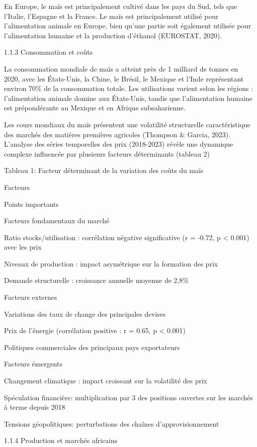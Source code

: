 \documentclass[12pt,oneside]{report}
\begin{document}
En Europe, le maïs est principalement cultivé dans les pays du Sud, tels que l'Italie, l'Espagne et la France. Le maïs est principalement utilisé pour l'alimentation animale en Europe, bien qu'une partie soit également utilisée pour l'alimentation humaine et la production d'éthanol (EUROSTAT, 2020).

1.1.3 Consommation et coûts

La consommation mondiale de maïs a atteint près de 1 milliard de tonnes en 2020, avec les États-Unis, la Chine, le Brésil, le Mexique et l'Inde représentant environ 70\% de la consommation totale. Les utilisations varient selon les régions : l'alimentation animale domine aux États-Unis, tandis que l'alimentation humaine est prépondérante au Mexique et en Afrique subsaharienne.

Les cours mondiaux du maïs présentent une volatilité structurelle caractéristique des marchés des matières premières agricoles (Thompson \& Garcia, 2023). L'analyse des séries temporelles des prix (2018-2023) révèle une dynamique complexe influencée par plusieurs facteurs déterminants (tableau 2)

Tableau 1: Facteur déterminant de la variation des coûts du maïs

Facteurs

Points importants

Facteurs fondamentaux du marché

Ratio stocks/utilisation : corrélation négative significative (r = -0.72, p < 0.001) avec les prix

Niveaux de production : impact asymétrique sur la formation des prix

Demande structurelle : croissance annuelle moyenne de 2,8\%

Facteurs externes

Variations des taux de change des principales devises

Prix de l'énergie (corrélation positive : r = 0.65, p < 0.001)

Politiques commerciales des principaux pays exportateurs

Facteurs émergents

Changement climatique : impact croissant sur la volatilité des prix

Spéculation financière: multiplication par 3 des positions ouvertes sur les marchés à terme depuis 2018

Tensions géopolitiques: perturbations des chaînes d'approvisionnement

1.1.4 Production et marchés africains
\end{document}
